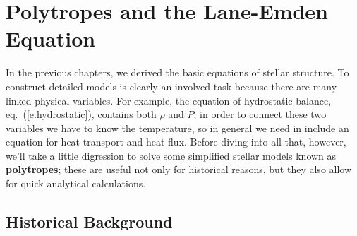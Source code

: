 \chapter{Polytropes and the Lane-Emden Equation}

In the previous chapters, we derived the basic equations of stellar structure. To construct detailed models is clearly an involved task because there are many linked physical variables. For example, the equation of hydrostatic balance, eq.~(\ref{e.hydrostatic}), contains both $\rho$ and $P$; in order to connect these two variables we have to know the temperature, so in general we need in include an equation for heat transport and heat flux. Before diving into all that, however, we'll take a little digression to solve some simplified stellar models known as \textbf{polytropes}; these are useful not only for historical reasons, but they also allow for quick analytical calculations.

\section{Historical Background}\label{s.LE-background}

